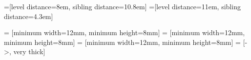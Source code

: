 \begin{frame}

=[level distance=8em, sibling distance=10.8em]
=[level distance=11em, sibling distance=4.3em]

 = [minimum width=12mm, minimum height=8mm]
 = [minimum width=12mm, minimum height=8mm]
 = [minimum width=12mm, minimum height=8mm]
 = [->, very thick]

\vspace{-2mm}

\vspace{4mm}


\end{frame}
